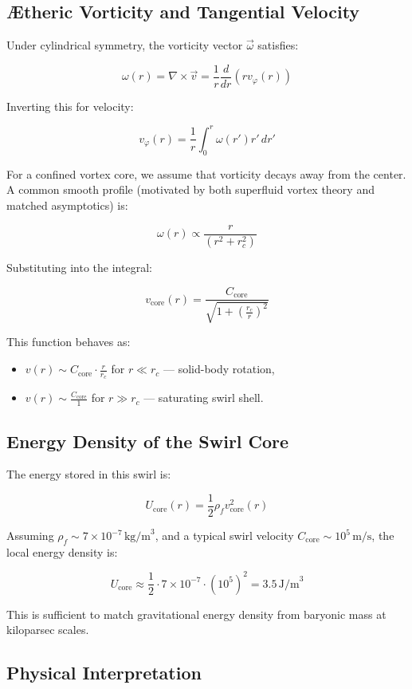 \documentclass[12pt]{article}
\begin{document}
\subsection{Ætheric Vorticity and Tangential Velocity}

Under cylindrical symmetry, the vorticity vector \( \vec{\omega} \) satisfies:

\[
\omega(r) = \nabla \times \vec{v} = \frac{1}{r} \frac{d}{dr} \left( r v_\varphi(r) \right)
\]

Inverting this for velocity:

\[
v_\varphi(r) = \frac{1}{r} \int_0^r \omega(r') r' \, dr'
\]

For a confined vortex core, we assume that vorticity decays away from the center. A common smooth profile (motivated by both superfluid vortex theory and matched asymptotics) is:

\[
\omega(r) \propto \frac{r}{(r^2 + r_c^2)}
\]

Substituting into the integral:

\[
v_\text{core}(r) = \frac{C_{\text{core}}}{\sqrt{1 + \left( \frac{r_c}{r} \right)^2 }}
\]

This function behaves as:
\begin{itemize}
    \item \( v(r) \sim C_{\text{core}} \cdot \frac{r}{r_c} \) for \( r \ll r_c \) — solid-body rotation,
    \item \( v(r) \sim \frac{C_{\text{core}}}{1} \) for \( r \gg r_c \) — saturating swirl shell.
\end{itemize}

\subsection{Energy Density of the Swirl Core}

The energy stored in this swirl is:

\[
U_{\text{core}}(r) = \frac{1}{2} \rho_{\!f} v_\text{core}^2(r)
\]

Assuming \( \rho_{\!f} \sim 7 \times 10^{-7}\, \text{kg/m}^3 \), and a typical swirl velocity \( C_{\text{core}} \sim 10^5\, \text{m/s} \), the local energy density is:

\[
U_{\text{core}} \approx \frac{1}{2} \cdot 7 \times 10^{-7} \cdot (10^5)^2 = 3.5\, \text{J/m}^3
\]

This is sufficient to match gravitational energy density from baryonic mass at kiloparsec scales.

\subsection{Physical Interpretation}
\end{document}
